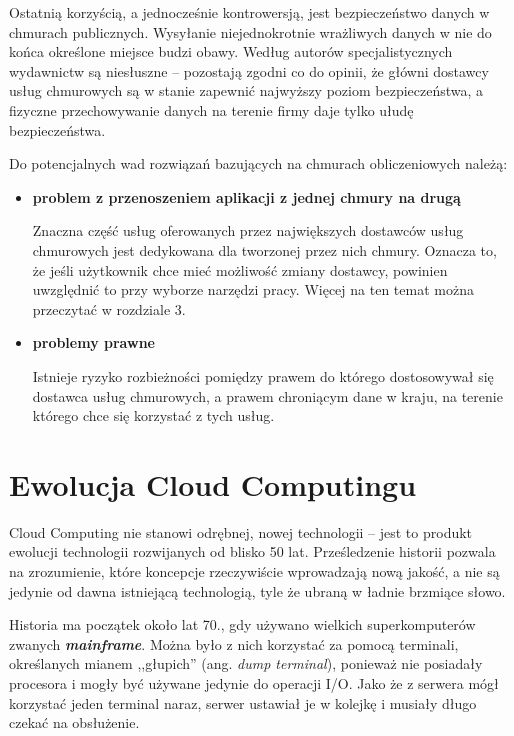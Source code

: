 \documentclass[12pt,a4paper,twoside,titlepage,openright]{book}
\begin{document}
Ostatnią korzyścią, a jednocześnie kontrowersją, jest bezpieczeństwo danych w chmurach publicznych. Wysyłanie niejednokrotnie wrażliwych danych w nie do końca określone miejsce budzi obawy. Według autorów specjalistycznych wydawnictw\cite{ccCambridge,ccBiznes} są niesłuszne -- pozostają zgodni co do opinii, że główni dostawcy usług chmurowych są w stanie zapewnić najwyższy poziom bezpieczeństwa, a fizyczne przechowywanie danych na terenie firmy daje tylko ułudę bezpieczeństwa.

Do potencjalnych wad rozwiązań bazujących na chmurach obliczeniowych należą:

\begin{itemize}

\item \textbf{problem z przenoszeniem aplikacji z jednej chmury na drugą}

Znaczna część usług oferowanych przez największych dostawców usług chmurowych jest dedykowana dla tworzonej przez nich chmury. Oznacza to, że jeśli użytkownik chce mieć możliwość zmiany dostawcy, powinien uwzględnić to przy wyborze narzędzi pracy. Więcej na ten temat można przeczytać w rozdziale 3.

\item \textbf{problemy prawne}

Istnieje ryzyko rozbieżności pomiędzy prawem do którego dostosowywał się dostawca usług chmurowych, a prawem chroniącym dane w kraju, na terenie którego chce się korzystać z tych usług. 

\end{itemize}


\section{Ewolucja Cloud Computingu}

Cloud Computing nie stanowi odrębnej, nowej technologii -- jest to produkt ewolucji technologii rozwijanych od blisko 50 lat. Prześledzenie historii pozwala na zrozumienie, które koncepcje rzeczywiście wprowadzają nową jakość, a nie są jedynie od dawna istniejącą technologią, tyle że  ubraną w ładnie brzmiące słowo.


Historia ma początek około lat 70., gdy używano wielkich superkomputerów zwanych \textbf{\textit{mainframe}}. Można było z nich korzystać za pomocą terminali, określanych mianem ,,głupich'' (ang. \textit{dump terminal}), ponieważ nie posiadały procesora i mogły być używane jedynie do operacji I/O. Jako że z serwera mógł korzystać jeden terminal naraz, serwer ustawiał je w kolejkę i musiały długo czekać na obsłużenie.
\end{document}
